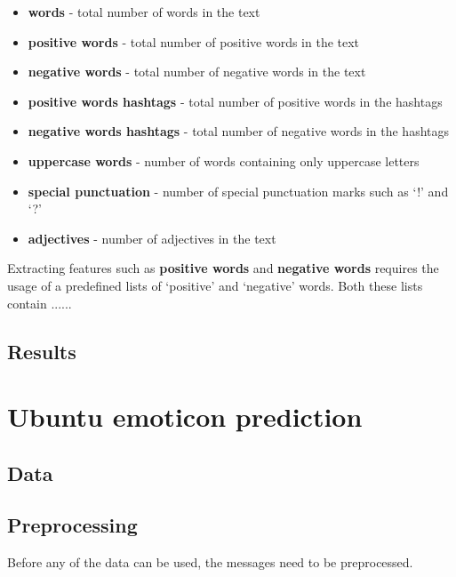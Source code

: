 \documentclass{article}
\begin{document}
\begin{itemize}
\item \textbf{words} - total number of words in the text
\item \textbf{positive words} - total number of positive words in the text
\item \textbf{negative words} - total number of negative words in the text
\item \textbf{positive words hashtags} - total number of positive words in the hashtags
\item \textbf{negative words hashtags} - total number of negative words in the hashtags
\item \textbf{uppercase words} - number of words containing only uppercase letters
\item \textbf{special punctuation} - number of special punctuation marks such as `!' and `?'
\item \textbf{adjectives} - number of adjectives in the text 
\end{itemize}

Extracting features such as \textbf{positive words} and \textbf{negative words} requires the usage of a predefined lists of `positive' and `negative' words. Both these lists contain ...... %

\subsection*{Results}

\pagebreak

\section*{Ubuntu emoticon prediction}

\subsection*{Data}

\subsection*{Preprocessing}

Before any of the data can be used, the messages need to be preprocessed. 
\end{document}
